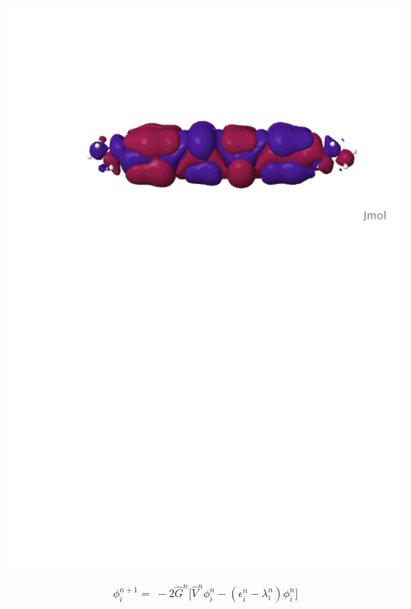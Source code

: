 \documentclass[mathserif, 10pt]{beamer}
\begin{document}
\begin{frame}
\begin{columns}
\begin{column}[b]{0.48\linewidth}
    \includegraphics[scale=0.25, clip, viewport = 80 560 600 700]{figures/can_orb_2.pdf}\\

    \vspace{2mm}

    \begin{equation}
        \nonumber
        \phi_i^{n+1} =\ -2\hat{G}^n\Bigg[\hat{V}^n\phi_i^n
        - (\epsilon^n_i - \lambda^n_i)\phi_i^n\Bigg]
    \end{equation}
    \end{column}


\end{columns}
\end{frame}
\end{document}
